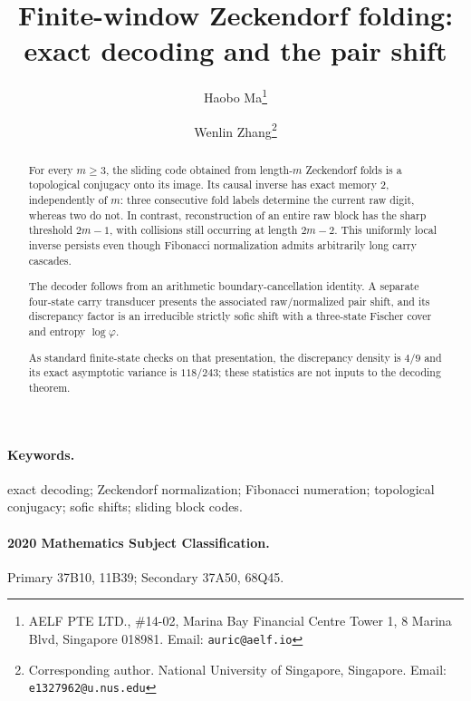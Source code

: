

\title{Finite-window Zeckendorf folding: exact decoding and the pair shift}
\author{
  Haobo Ma\thanks{AELF PTE LTD., \#14-02, Marina Bay Financial Centre Tower 1, 8 Marina Blvd, Singapore 018981. Email: \texttt{auric@aelf.io}}
  \and
  Wenlin Zhang\thanks{Corresponding author. National University of Singapore, Singapore. Email: \texttt{e1327962@u.nus.edu}}
}
\date{}


\maketitle

\begin{abstract}
For every \(m\ge3\), the sliding code obtained from length-\(m\) Zeckendorf folds is a topological conjugacy onto its image. Its causal inverse has exact memory \(2\), independently of \(m\): three consecutive fold labels determine the current raw digit, whereas two do not. In contrast, reconstruction of an entire raw block has the sharp threshold \(2m-1\), with collisions still occurring at length \(2m-2\). This uniformly local inverse persists even though Fibonacci normalization admits arbitrarily long carry cascades.

The decoder follows from an arithmetic boundary-cancellation identity. A separate four-state carry transducer presents the associated raw/normalized pair shift, and its discrepancy factor is an irreducible strictly sofic shift with a three-state Fischer cover and entropy \(\log\varphi\).

As standard finite-state checks on that presentation, the discrepancy density is \(4/9\) and its exact asymptotic variance is \(118/243\); these statistics are not inputs to the decoding theorem.
\end{abstract}

\paragraph{Keywords.}
exact decoding; Zeckendorf normalization; Fibonacci numeration; topological conjugacy; sofic shifts; sliding block codes.

\paragraph{2020 Mathematics Subject Classification.}
Primary 37B10, 11B39; Secondary 37A50, 68Q45.








\appendix









